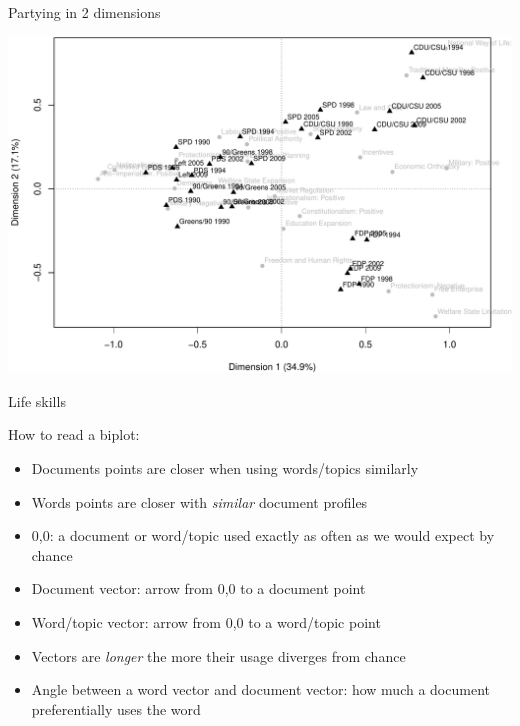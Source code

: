 \documentclass{hertieteaching}
\begin{document}
\begin{frame}{Partying in 2 dimensions}

\centerline{\includegraphics[scale=0.5]{pictures/grey-just-rile-crop}}

\end{frame}
\begin{frame}{Life skills}

How to read a biplot:
\begin{itemize}
  \item Documents points are closer when using words/topics similarly
  \item Words points are closer with \textit{similar} document profiles
  \item 0,0: a document or word/topic used exactly as often as we would expect by chance
  \item Document vector: arrow from 0,0 to a document point
  \item Word/topic vector: arrow from 0,0 to a word/topic point
  \item Vectors are \textit{longer} the more their usage diverges from chance
  \item Angle between a word vector and document vector: how much a
    document preferentially uses the word
\end{itemize}


\end{frame}
\end{document}
